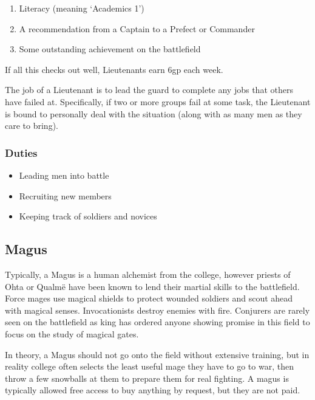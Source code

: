 \begin{multicols}{2}
\begin{enumerate}

  \item{Literacy (meaning `Academics 1')}
  \item{A recommendation from a Captain to a Prefect or Commander}
  \item{Some outstanding achievement on the battlefield}

\end{enumerate}

\noindent
If all this checks out well, Lieutenants earn 6gp each week.

The job of a Lieutenant is to lead the \gls{guard} to complete any jobs that others have failed at.
Specifically, if two or more groups fail at some task, the Lieutenant is bound to personally deal with the situation (along with as many men as they care to bring).

\subsubsection{Duties}

\begin{itemize}

  \item{Leading men into battle}
  \item{Recruiting new members}
  \item{Keeping track of soldiers and novices}

\end{itemize}

\subsection{Magus}

Typically, a Magus is a human alchemist from the \gls{college}, however priests of Ohta or Qualm\"e have been known to lend their martial skills to the battlefield.
Force mages use magical shields to protect wounded soldiers and scout ahead with magical senses.
Invocationists destroy enemies with fire.
Conjurers are rarely seen on the battlefield as \gls{king} has ordered anyone showing promise in this field to focus on the study of magical gates.

In theory, a Magus should not go onto the field without extensive training, but in reality \gls{college} often selects the least useful mage they have to go to war, then throw a few snowballs at them to prepare them for real fighting.
A magus is typically allowed free access to buy anything by request, but they are not paid.


\end{multicols}
